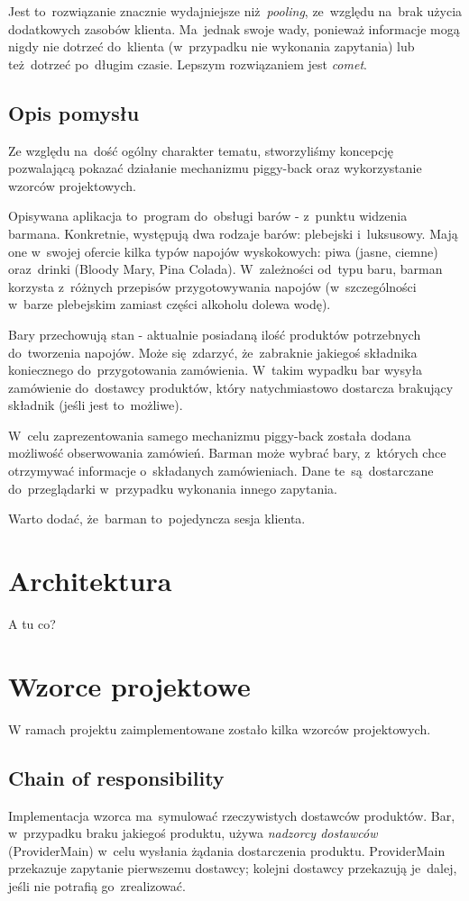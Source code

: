 \documentclass[11pt]{aghdpl}
\begin{document}
Jest to~rozwiązanie znacznie wydajniejsze niż~\textit{pooling}, ze~względu na~brak użycia dodatkowych zasobów klienta. Ma~jednak swoje wady, ponieważ informacje mogą nigdy nie dotrzeć do~klienta (w~przypadku nie wykonania zapytania) lub też~dotrzeć po~długim czasie. Lepszym rozwiązaniem jest \textit{comet}.

\section{Opis pomysłu}
Ze względu na~dość ogólny charakter tematu, stworzyliśmy koncepcję pozwalającą pokazać działanie mechanizmu piggy-back oraz wykorzystanie wzorców projektowych.

Opisywana aplikacja to~program do~obsługi barów - z~punktu widzenia barmana. Konkretnie, występują dwa rodzaje barów: plebejski i~luksusowy. Mają one w~swojej ofercie kilka typów napojów wyskokowych: piwa (jasne, ciemne) oraz~drinki (Bloody Mary, Pina Colada). W~zależności od~typu baru, barman korzysta z~różnych przepisów przygotowywania napojów (w~szczególności w~barze plebejskim zamiast części alkoholu dolewa wodę). 

Bary przechowują stan - aktualnie posiadaną ilość produktów potrzebnych do~tworzenia napojów. Może się~zdarzyć, że~zabraknie jakiegoś składnika koniecznego do~przygotowania zamówienia. W~takim wypadku bar wysyła zamówienie do~dostawcy produktów, który natychmiastowo dostarcza brakujący składnik (jeśli jest to~możliwe). 

W~celu zaprezentowania samego mechanizmu piggy-back została dodana możliwość obserwowania zamówień. Barman może wybrać bary, z~których chce otrzymywać informacje o~składanych zamówieniach. Dane te~są~dostarczane do~przeglądarki w~przypadku wykonania innego zapytania.

Warto dodać, że~barman to~pojedyncza sesja klienta.
\chapter{Architektura}
A tu co?

\chapter{Wzorce projektowe}
W ramach projektu zaimplementowane zostało kilka wzorców projektowych.
\section{Chain of responsibility}
Implementacja wzorca ma~symulować rzeczywistych dostawców produktów. Bar, w~przypadku braku jakiegoś produktu, używa \textit{nadzorcy dostawców} (ProviderMain) w~celu wysłania żądania dostarczenia produktu. ProviderMain przekazuje zapytanie pierwszemu dostawcy;
kolejni dostawcy przekazują je~dalej, jeśli nie potrafią go~zrealizować.
\end{document}
